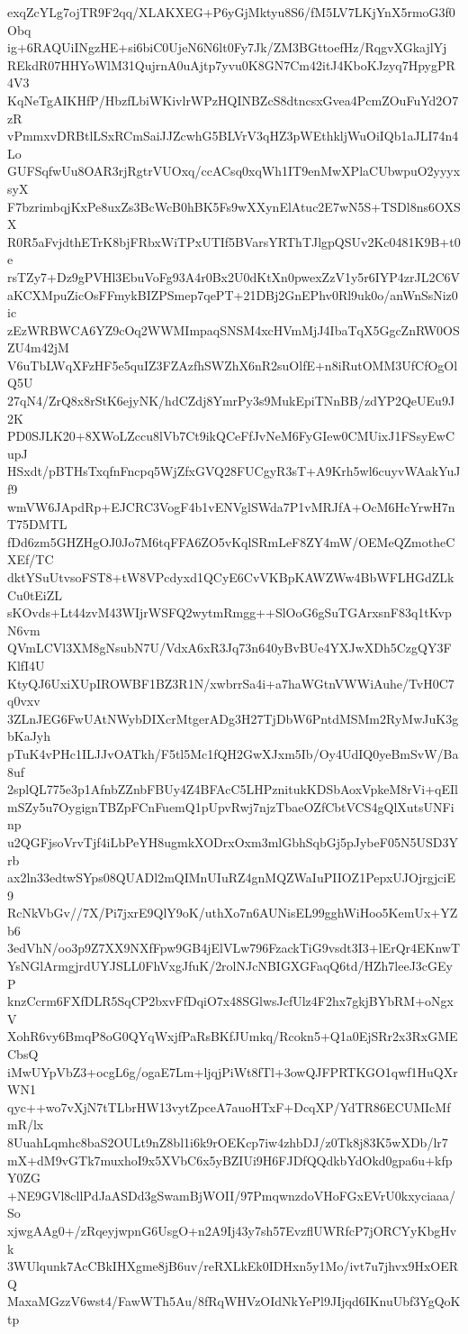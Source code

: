 exqZcYLg7ojTR9F2qq/XLAKXEG+P6yGjMktyu8S6/fM5LV7LKjYnX5rmoG3f0Obq
ig+6RAQUiINgzHE+si6biC0UjeN6N6lt0Fy7Jk/ZM3BGttoefHz/RqgvXGkajlYj
REkdR07HHYoWlM31QujrnA0uAjtp7yvu0K8GN7Cm42itJ4KboKJzyq7HpygPR4V3
KqNeTgAIKHfP/HbzfLbiWKivlrWPzHQINBZcS8dtncsxGvea4PcmZOuFuYd2O7zR
vPmmxvDRBtlLSxRCmSaiJJZcwhG5BLVrV3qHZ3pWEthkljWuOiIQb1aJLI74n4Lo
GUFSqfwUu8OAR3rjRgtrVUOxq/ccACsq0xqWh1IT9enMwXPlaCUbwpuO2yyyxsyX
F7bzrimbqjKxPe8uxZs3BcWcB0hBK5Fs9wXXynElAtuc2E7wN5S+TSDl8ns6OXSX
R0R5aFvjdthETrK8bjFRbxWiTPxUTIf5BVarsYRThTJlgpQSUv2Kc0481K9B+t0e
rsTZy7+Dz9gPVHl3EbuVoFg93A4r0Bx2U0dKtXn0pwexZzV1y5r6IYP4zrJL2C6V
aKCXMpuZicOsFFmykBIZPSmep7qePT+21DBj2GnEPhv0Rl9uk0o/anWnSsNiz0ic
zEzWRBWCA6YZ9cOq2WWMImpaqSNSM4xcHVmMjJ4IbaTqX5GgcZnRW0OSZU4m42jM
V6uTbLWqXFzHF5e5quIZ3FZAzfhSWZhX6nR2suOlfE+n8iRutOMM3UfCfOgOlQ5U
27qN4/ZrQ8x8rStK6ejyNK/hdCZdj8YmrPy3s9MukEpiTNnBB/zdYP2QeUEu9J2K
PD0SJLK20+8XWoLZccu8lVb7Ct9ikQCeFfJvNeM6FyGIew0CMUixJ1FSsyEwCupJ
HSxdt/pBTHsTxqfnFncpq5WjZfxGVQ28FUCgyR3sT+A9Krh5wl6cuyvWAakYuJf9
wmVW6JApdRp+EJCRC3VogF4b1vENVglSWda7P1vMRJfA+OcM6HcYrwH7nT75DMTL
fDd6zm5GHZHgOJ0Jo7M6tqFFA6ZO5vKqlSRmLeF8ZY4mW/OEMeQZmotheCXEf/TC
dktYSuUtvsoFST8+tW8VPcdyxd1QCyE6CvVKBpKAWZWw4BbWFLHGdZLkCu0tEiZL
sKOvds+Lt44zvM43WIjrWSFQ2wytmRmgg++SlOoG6gSuTGArxsnF83q1tKvpN6vm
QVmLCVl3XM8gNsubN7U/VdxA6xR3Jq73n640yBvBUe4YXJwXDh5CzgQY3FKlfI4U
KtyQJ6UxiXUpIROWBF1BZ3R1N/xwbrrSa4i+a7haWGtnVWWiAuhe/TvH0C7q0vxv
3ZLnJEG6FwUAtNWybDIXcrMtgerADg3H27TjDbW6PntdMSMm2RyMwJuK3gbKaJyh
pTuK4vPHc1ILJJvOATkh/F5tl5Mc1fQH2GwXJxm5Ib/Oy4UdIQ0yeBmSvW/Ba8uf
2splQL775e3p1AfnbZZnbFBUy4Z4BFAcC5LHPznitukKDSbAoxVpkeM8rVi+qEIl
mSZy5u7OygignTBZpFCnFuemQ1pUpvRwj7njzTbaeOZfCbtVCS4gQlXutsUNFinp
u2QGFjsoVrvTjf4iLbPeYH8ugmkXODrxOxm3mlGbhSqbGj5pJybeF05N5USD3Yrb
ax2ln33edtwSYps08QUADl2mQIMnUIuRZ4gnMQZWaIuPIIOZ1PepxUJOjrgjciE9
RcNkVbGv//7X/Pi7jxrE9QlY9oK/uthXo7n6AUNisEL99gghWiHoo5KemUx+YZb6
3edVhN/oo3p9Z7XX9NXfFpw9GB4jElVLw796FzackTiG9vsdt3I3+lErQr4EKnwT
YsNGlArmgjrdUYJSLL0FhVxgJfuK/2rolNJcNBIGXGFaqQ6td/HZh7leeJ3cGEyP
knzCcrm6FXfDLR5SqCP2bxvFfDqiO7x48SGlwsJcfUlz4F2hx7gkjBYbRM+oNgxV
XohR6vy6BmqP8oG0QYqWxjfPaRsBKfJUmkq/Rcokn5+Q1a0EjSRr2x3RxGMECbsQ
iMwUYpVbZ3+ocgL6g/ogaE7Lm+ljqjPiWt8fTl+3owQJFPRTKGO1qwf1HuQXrWN1
qyc++wo7vXjN7tTLbrHW13vytZpceA7auoHTxF+DcqXP/YdTR86ECUMIcMfmR/lx
8UuahLqmhc8baS2OULt9nZ8bl1i6k9rOEKcp7iw4zhbDJ/z0Tk8j83K5wXDb/lr7
mX+dM9vGTk7muxhoI9x5XVbC6x5yBZIUi9H6FJDfQQdkbYdOkd0gpa6u+kfpY0ZG
+NE9GVl8cllPdJaASDd3gSwamBjWOII/97PmqwnzdoVHoFGxEVrU0kxyciaaa/So
xjwgAAg0+/zRqeyjwpnG6UsgO+n2A9Ij43y7sh57EvzflUWRfcP7jORCYyKbgHvk
3WUlqunk7AcCBkIHXgme8jB6uv/reRXLkEk0IDHxn5y1Mo/ivt7u7jhvx9HxOERQ
MaxaMGzzV6wst4/FawWTh5Au/8fRqWHVzOIdNkYePl9JIjqd6IKnuUbf3YgQoKtp
